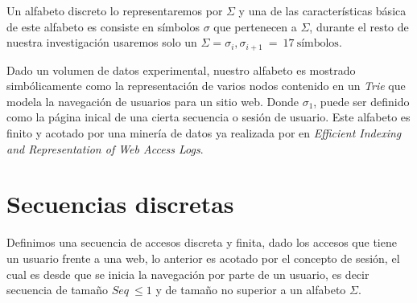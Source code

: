 Un alfabeto discreto lo representaremos por $\Sigma$ y una de las características básica de este alfabeto es consiste en símbolos $\sigma$ que pertenecen a $\Sigma$, durante el resto de nuestra investigación usaremos solo un $\Sigma = \sigma_{i},\sigma_{i+1}\ =\ 17\  \mbox{símbolos}$.



Dado un volumen de datos experimental, nuestro alfabeto es mostrado simbólicamente como la representación de varios nodos contenido en un \emph{Trie} que modela la navegación de usuarios para un sitio web.
Donde $\sigma_{1}$, puede ser definido como la página inical de una cierta secuencia  o sesión de usuario. Este alfabeto es finito y acotado por una minería de datos ya realizada por \cite{Claude2014} en \emph{Efficient Indexing and Representation of Web Access Logs}. %




\section{Secuencias discretas}

Definimos una secuencia de accesos discreta y finita, dado los accesos que tiene un usuario frente a una web, lo anterior es acotado por el concepto de sesión, el cual es desde que se inicia la navegación por parte de un usuario, es decir secuencia de tamaño $Seq\ \leq 1$ y de tamaño no superior a un alfabeto $\Sigma$.



